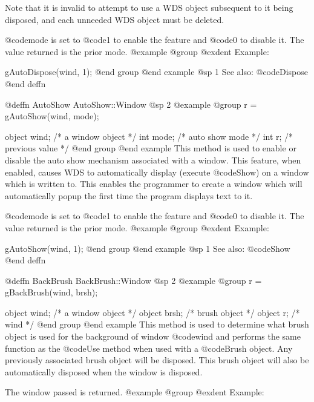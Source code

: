 Note that it is invalid to attempt to use a WDS object subsequent to it
being disposed, and each unneeded WDS object must be deleted.

@code{mode} is set to @code{1} to enable the feature and @code{0}
to disable it.  The value returned is the prior mode.
@example
@group
@exdent Example:

gAutoDispose(wind, 1);
@end group
@end example
@sp 1
See also:  @code{Dispose}
@end deffn











@deffn {AutoShow} AutoShow::Window
@sp 2
@example
@group
r = gAutoShow(wind, mode);

object   wind;     /*  a window object    */
int      mode;     /*  auto show mode     */
int      r;        /*  previous value     */
@end group
@end example
This method is used to enable or disable the auto show mechanism
associated with a window.  This feature, when enabled, causes WDS to
automatically display (execute @code{Show}) on a window which is written
to.  This enables the programmer to create a window which will automatically
popup the first time the program displays text to it.

@code{mode} is set to @code{1} to enable the feature and @code{0}
to disable it.  The value returned is the prior mode.
@example
@group
@exdent Example:

gAutoShow(wind, 1);
@end group
@end example
@sp 1
See also:  @code{Show}
@end deffn











@deffn {BackBrush} BackBrush::Window
@sp 2
@example
@group
r = gBackBrush(wind, brsh);

object  wind;   /*  a window object   */
object  brsh;   /*  brush object      */
object  r;      /*  wind              */
@end group
@end example
This method is used to determine what brush object is used for the
background of window @code{wind} and performs the same function as the
@code{Use} method when used with a @code{Brush} object.  Any previously
associated brush object will be disposed.  This brush object will also
be automatically disposed when the window is disposed.

The window passed is returned.
@example
@group
@exdent Example:


